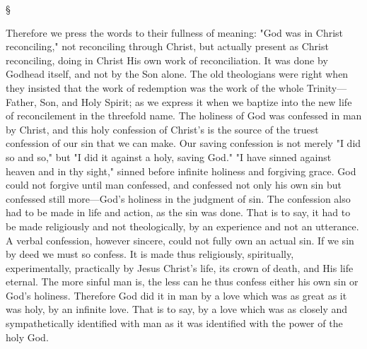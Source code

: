 \documentclass[12pt,a5paper,twoside,titlepage]{book}
\begin{document}
\begin{center}
\S
\end{center}

Therefore we press the words to their fullness 
of meaning: "God was in Christ reconciling," 
not reconciling through Christ, but actually 
present as Christ reconciling, doing in Christ 
His own work of reconciliation. It was done by 
Godhead itself, and not by the Son alone. The 
old theologians were right when they insisted 
that the work of redemption was the work of 
the whole Trinity---Father, Son, and Holy 
Spirit; as we express it when we baptize into 
the new life of reconcilement in the threefold 
name. The holiness of God was confessed in 
man by Christ, and this holy confession of 
Christ's is the source of the truest confession of 
our sin that we can make. Our saving confession 
is not merely "I did so and so," but "I did 
it against a holy, saving God." "I have sinned 
against heaven and in thy sight," sinned before 
infinite holiness and forgiving grace. God could 
not forgive until man confessed, and confessed 
not only his own sin but confessed still more---God's 
holiness in the judgment of sin. The 
confession also had to be made in life and action, 
as the sin was done. That is to say, it had to be 
made religiously and not theologically, by an 
experience and not an utterance. A verbal 
confession, however sincere, could not fully own 
an actual sin. If we sin by deed we must so 
confess. It is made thus religiously, spiritually, 
experimentally, practically by Jesus Christ's 
life, its crown of death, and His life eternal. 
The more sinful man is, the less can he thus 
confess either his own sin or God's holiness. 
Therefore God did it in man by a love which 
was as great as it was holy, by an infinite love. 
That is to say, by a love which was as closely 
and sympathetically identified with man as it 
was identified with the power of the holy God. 
\end{document}
